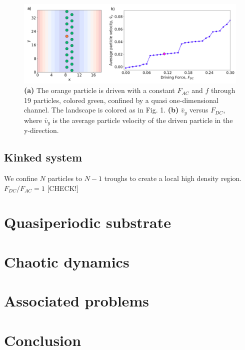 \documentclass[prb,preprint]{revtex4}
\begin{document}
\begin{center}
\begin{figure}[h!]
\centering
\includegraphics[scale=.40]{twenty}
\caption{\textbf{(a)} The orange particle is driven with a constant $F_{AC}$ and $f$ through 19 particles, colored green, confined by a quasi one-dimensional channel. The landscape is colored as in Fig. 1. \textbf{(b)} $\bar{v}_{y}$ versus $F_{DC}$, where $\bar{v}_{y}$ is the average particle velocity of the driven particle in the y-direction.}
\end{figure}
\end{center}

\subsection{Kinked system}
\label{sec:static}	%
We confine $N$ particles to $N-1$ troughs to create a
local high density region.
$F_{DC}/F_{AC} = 1$ [CHECK!]



\section{Quasiperiodic substrate}
\label{sec:quasiperiod}	%

\section{Chaotic dynamics}
\label{sec:chaos}	%

\section{Associated problems}



\section{Conclusion}
\end{document}
